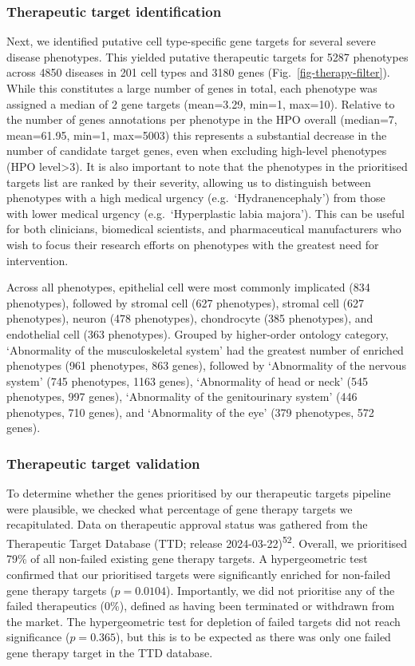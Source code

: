 \documentclass[
sn-nature
]{sn-jnl}
\begin{document}
\subsubsection{Therapeutic target
identification}\label{therapeutic-target-identification}

Next, we identified putative cell type-specific gene targets for several
severe disease phenotypes. This yielded putative therapeutic targets for
5287 phenotypes across 4850 diseases in 201 cell types and 3180 genes
(Fig.~\ref{fig-therapy-filter}). While this constitutes a large number
of genes in total, each phenotype was assigned a median of 2 gene
targets (mean=3.29, min=1, max=10). Relative to the number of genes
annotations per phenotype in the HPO overall (median=7, mean=61.95,
min=1, max=5003) this represents a substantial decrease in the number of
candidate target genes, even when excluding high-level phenotypes (HPO
level\textgreater3). It is also important to note that the phenotypes in
the prioritised targets list are ranked by their severity, allowing us
to distinguish between phenotypes with a high medical urgency
(e.g.~`Hydranencephaly') from those with lower medical urgency
(e.g.~`Hyperplastic labia majora'). This can be useful for both
clinicians, biomedical scientists, and pharmaceutical manufacturers who
wish to focus their research efforts on phenotypes with the greatest
need for intervention.

Across all phenotypes, epithelial cell were most commonly implicated
(834 phenotypes), followed by stromal cell (627 phenotypes), stromal
cell (627 phenotypes), neuron (478 phenotypes), chondrocyte (385
phenotypes), and endothelial cell (363 phenotypes). Grouped by
higher-order ontology category, `Abnormality of the musculoskeletal
system' had the greatest number of enriched phenotypes (961 phenotypes,
863 genes), followed by `Abnormality of the nervous system' (745
phenotypes, 1163 genes), `Abnormality of head or neck' (545 phenotypes,
997 genes), `Abnormality of the genitourinary system' (446 phenotypes,
710 genes), and `Abnormality of the eye' (379 phenotypes, 572 genes).

\subsubsection{Therapeutic target
validation}\label{therapeutic-target-validation}

To determine whether the genes prioritised by our therapeutic targets
pipeline were plausible, we checked what percentage of gene therapy
targets we recapitulated. Data on therapeutic approval status was
gathered from the Therapeutic Target Database (TTD; release
2024-03-22)\textsuperscript{52}. Overall, we prioritised 79\% of all
non-failed existing gene therapy targets. A hypergeometric test
confirmed that our prioritised targets were significantly enriched for
non-failed gene therapy targets (\(p=0.0104\)). Importantly, we did not
prioritise any of the failed therapeutics (0\%), defined as having been
terminated or withdrawn from the market. The hypergeometric test for
depletion of failed targets did not reach significance (\(p=0.365\)),
but this is to be expected as there was only one failed gene therapy
target in the TTD database.
\end{document}
